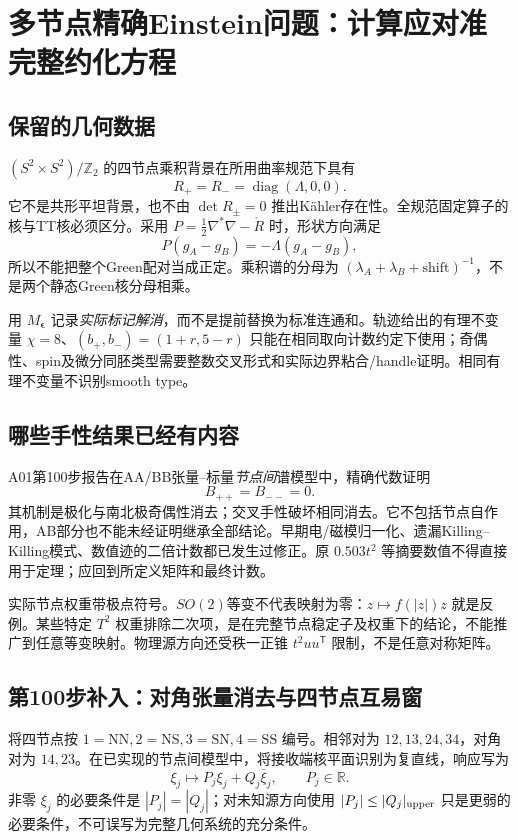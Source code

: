 \documentclass[UTF8,a4paper,11pt,fontset=fandol]{ctexart}
\numberwithin{equation}{section}
\theoremstyle{definition}
\newcommand{\R}{\mathbb R}
\newcommand{\Z}{\mathbb Z}
\begin{document}
\section{多节点精确Einstein问题：计算应对准完整约化方程}
\subsection{保留的几何数据}
$(S^2\times S^2)/\Z_2$ 的四节点乘积背景在所用曲率规范下具有
\[
R_+=R_-=\operatorname{diag}(\Lambda,0,0).
\]
它不是共形平坦背景，也不由 $\det R_\pm=0$ 推出K\"ahler存在性。全规范固定算子的核与TT核必须区分。采用 $P=\frac12\nabla^*\nabla-\mathring R$ 时，形状方向满足
\[
P(g_A-g_B)=-\Lambda(g_A-g_B),
\]
所以不能把整个Green配对当成正定。乘积谱的分母为 $(\lambda_A+\lambda_B+\text{shift})^{-1}$，不是两个静态Green核分母相乘。

用 $M_{\boldsymbol\epsilon}$ 记录\emph{实际标记解消}，而不是提前替换为标准连通和。轨迹给出的有理不变量 $\chi=8$、$(b_+,b_-)=(1+r,5-r)$ 只能在相同取向计数约定下使用；奇偶性、spin及微分同胚类型需要整数交叉形式和实际边界粘合/handle证明。相同有理不变量不识别smooth type。

\subsection{哪些手性结果已经有内容}
A01第100步报告在AA/BB张量--标量\emph{节点间}谱模型中，精确代数证明
\[
B_{++}=B_{--}=0.
\]
其机制是极化与南北极奇偶性消去；交叉手性破坏相同消去。它不包括节点自作用，AB部分也不能未经证明继承全部结论。早期电/磁模归一化、遗漏Killing--Killing模式、数值迹的二倍计数都已发生过修正。原 $0.503t^2$ 等摘要数值不得直接用于定理；应回到所定义矩阵和最终计数。

实际节点权重带极点符号。$SO(2)$等变不代表映射为零：$z\mapsto f(|z|)z$ 就是反例。某些特定 $T^2$ 权重排除二次项，是在完整节点稳定子及权重下的结论，不能推广到任意等变映射。物理源方向还受秩一正锥 $t^2uu^{\mathsf T}$ 限制，不是任意对称矩阵。

\subsection{第100步补入：对角张量消去与四节点互易窗}
将四节点按 $1=\mathrm{NN},2=\mathrm{NS},3=\mathrm{SN},4=\mathrm{SS}$ 编号。相邻对为 $12,13,24,34$，对角对为 $14,23$。在已实现的节点间模型中，将接收端核平面识别为复直线，响应写为
\[
\xi_j\longmapsto P_j\xi_j+Q_j\bar\xi_j,
\qquad P_j\in\R.
\]
非零 $\xi_j$ 的必要条件是 $|P_j|=|Q_j|$；对未知源方向使用 $|P_j|\le |Q_j|_{\rm upper}$ 只是更弱的必要条件，不可误写为完整几何系统的充分条件。
\end{document}
